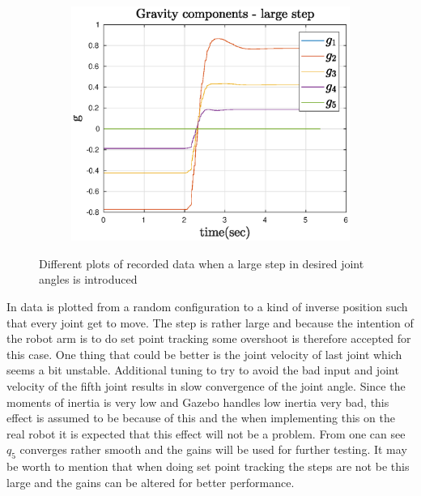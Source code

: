 \begin{figure}[htbp]
    ~
    \begin{subfigure}[htbp]{0.45\textwidth}
        \centering
        \includegraphics[width = \picsSiz\linewidth]{img/LSgrav.eps}
        \caption{ }
    \end{subfigure}
    \caption{Different plots of recorded data when a large step in desired joint angles is introduced}
    \label{fig:LS}
\end{figure}
In  data is plotted from a random configuration to a kind of inverse position such that every joint get to move. The step is rather large and because the intention of the robot arm is to do set point tracking some overshoot is therefore accepted for this case.  One thing that could be better is the joint velocity of last joint which seems a bit unstable. Additional tuning to try to avoid the bad input and joint velocity of the fifth joint results in slow convergence of the joint angle. Since the moments of inertia is very low and Gazebo handles low inertia very bad, this effect is assumed to be because of this and the when implementing this on the real robot it is expected that this effect will not be a problem. From  one can see $q_5$ converges rather smooth and the gains will be used for further testing. It may be worth to mention that when doing set point tracking the steps are not be this large and the gains can be altered for better performance.  \\\\
